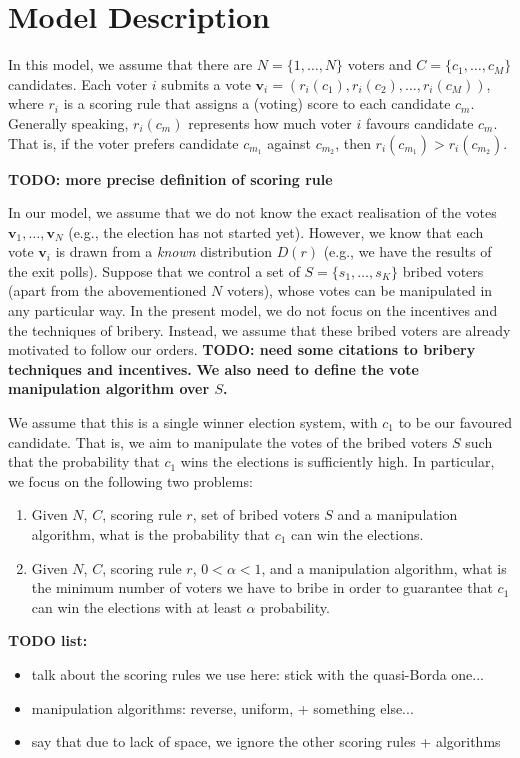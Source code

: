 
\section{Model Description}
\label{section:model}

\noindent
In this model, we assume that there are $N = \{1,\dots,N\}$ voters and $C=\{c_1,\dots, c_M\}$ candidates. 
Each voter $i$ submits a vote $\mathbf{v}_i = (r_i(c_1), r_i(c_2), \dots, r_i(c_M))$, where $r_i$ is a scoring rule that assigns a (voting) score to each candidate $c_m$. 
Generally speaking, $r_i(c_m)$ represents how much voter $i$ favours candidate $c_m$.
That is, if the voter prefers candidate $c_{m_1}$ against $c_{m_2}$, then $r_i(c_{m_1}) > r_i(c_{m_2})$.

\textbf{TODO: more precise definition of scoring rule}

In our model, we assume that we do not know the exact realisation of the votes $\mathbf{v}_1,\dots, \mathbf{v}_N $ (e.g., the election has not started yet).
However, we know that each vote $\mathbf{v}_i$ is drawn from a \emph{known} distribution $D(r)$ (e.g., we have the results of the exit polls).
Suppose that we control a set of $S = \{s_1,\dots,s_K\}$ bribed voters (apart from the abovementioned $N$ voters), whose votes can be manipulated in any particular way.
In the present model, we do not focus on the incentives and the techniques of bribery.
Instead, we assume that these bribed voters are already motivated to follow our orders.
\textbf{TODO: need some citations to bribery techniques and incentives.} 
\textbf{We also need to define the vote manipulation algorithm over $S$.} 

We assume that this is a single winner election system, with $c_1$ to be our favoured candidate.
That is, we aim to manipulate the votes of the bribed voters $S$ such that the probability that $c_1$ wins the elections is sufficiently high.
In particular, we focus on the following two problems:

\begin{enumerate}
\item Given $N$, $C$, scoring rule $r$, set of bribed voters $S$ and a manipulation algorithm, what is the probability that $c_1$ can win the elections.
\item Given $N$, $C$, scoring rule $r$, $0 < \alpha < 1$, and a manipulation algorithm, what is the minimum number of voters we have to bribe in order to guarantee that $c_1$ can win the elections with at least $\alpha$ probability.
\end{enumerate}

\textbf{TODO list:}
\begin{itemize}
\item talk about the scoring rules we use here: stick with the quasi-Borda one...
\item manipulation algorithms: reverse, uniform, + something else...
\item say that due to lack of space, we ignore the other scoring rules + algorithms
\end{itemize}

